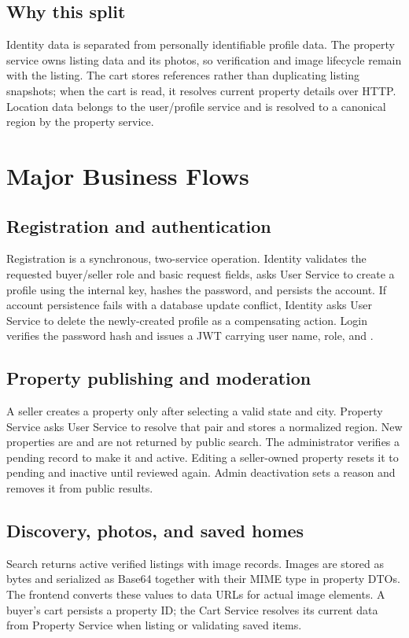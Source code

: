 \documentclass[11pt,a4paper]{article}
\newcommand{\code}[1]{\texttt{\detokenize{#1}}}
\begin{document}
\subsection{Why this split}
Identity data is separated from personally identifiable profile data. The property
service owns listing data and its photos, so verification and image lifecycle remain
with the listing. The cart stores references rather than duplicating listing
snapshots; when the cart is read, it resolves current property details over HTTP.
Location data belongs to the user/profile service and is resolved to a canonical
\code{City, State} region by the property service.

\section{Major Business Flows}
\subsection{Registration and authentication}
Registration is a synchronous, two-service operation. Identity validates the
requested buyer/seller role and basic request fields, asks User Service to create a
profile using the internal key, hashes the password, and persists the account.
If account persistence fails with a database update conflict, Identity asks User
Service to delete the newly-created profile as a compensating action. Login verifies
the password hash and issues a JWT carrying user name, role, and \code{profileId}.

\subsection{Property publishing and moderation}
A seller creates a property only after selecting a valid state and city. Property
Service asks User Service to resolve that pair and stores a normalized region.
New properties are \code{Pending} and are not returned by public search. The
administrator verifies a pending record to make it \code{Verified} and active.
Editing a seller-owned property resets it to pending and inactive until reviewed
again. Admin deactivation sets a reason and removes it from public results.

\subsection{Discovery, photos, and saved homes}
Search returns active verified listings with image records. Images are stored as
bytes and serialized as Base64 together with their MIME type in property DTOs. The
frontend converts these values to data URLs for actual image elements. A buyer's
cart persists a property ID; the Cart Service resolves its current data from
Property Service when listing or validating saved items.
\end{document}
